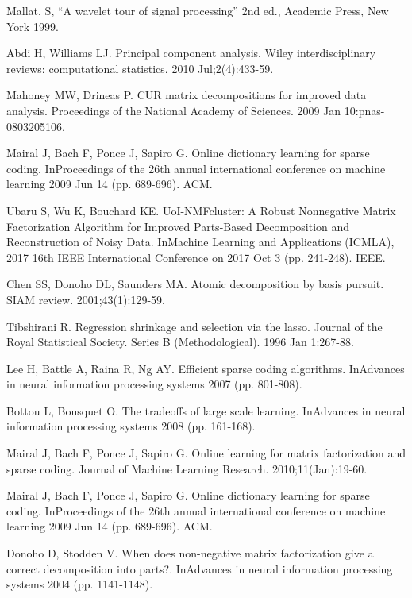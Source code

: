\documentclass[conference]{IEEEtran}
\begin{document}
\begin{thebibliography}{00}

 Mallat, S, ``A wavelet tour of signal processing'' 2nd ed., Academic Press, New York 1999.

 Abdi H, Williams LJ. Principal component analysis. Wiley interdisciplinary reviews: computational statistics. 2010 Jul;2(4):433-59.

 Mahoney MW, Drineas P. CUR matrix decompositions for improved data analysis. Proceedings of the National Academy of Sciences. 2009 Jan 10:pnas-0803205106.

 Mairal J, Bach F, Ponce J, Sapiro G. Online dictionary learning for sparse coding. InProceedings of the 26th annual international conference on machine learning 2009 Jun 14 (pp. 689-696). ACM.


 Ubaru S, Wu K, Bouchard KE. UoI-NMFcluster: A Robust Nonnegative Matrix Factorization Algorithm for Improved Parts-Based Decomposition and Reconstruction of Noisy Data. InMachine Learning and Applications (ICMLA), 2017 16th IEEE International Conference on 2017 Oct 3 (pp. 241-248). IEEE.

 Chen SS, Donoho DL, Saunders MA. Atomic decomposition by basis pursuit. SIAM review. 2001;43(1):129-59.

 Tibshirani R. Regression shrinkage and selection via the lasso. Journal of the Royal Statistical Society. Series B (Methodological). 1996 Jan 1:267-88.

 Lee H, Battle A, Raina R, Ng AY. Efficient sparse coding algorithms. InAdvances in neural information processing systems 2007 (pp. 801-808).

 Bottou L, Bousquet O. The tradeoffs of large scale learning. InAdvances in neural information processing systems 2008 (pp. 161-168).

 Mairal J, Bach F, Ponce J, Sapiro G. Online learning for matrix factorization and sparse coding. Journal of Machine Learning Research. 2010;11(Jan):19-60.

 Mairal J, Bach F, Ponce J, Sapiro G. Online dictionary learning for sparse coding. InProceedings of the 26th annual international conference on machine learning 2009 Jun 14 (pp. 689-696). ACM.

 Donoho D, Stodden V. When does non-negative matrix factorization give a correct decomposition into parts?. InAdvances in neural information processing systems 2004 (pp. 1141-1148).

\end{thebibliography}
\vspace{12pt}
\end{document}
